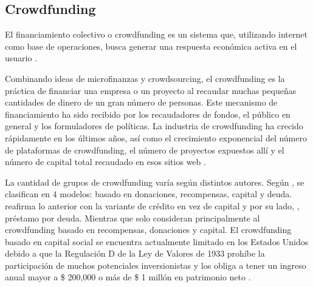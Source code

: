\subsection{Crowdfunding}
El financiamiento colectivo o crowdfunding es un sistema que, utilizando internet como base de operaciones, busca generar una respuesta económica activa en el usuario \parencite{cr_lopezgolan2017crowdfunding}.

Combinando ideas de microfinanzas y crowdsourcing, el crowdfunding es la práctica de financiar una empresa o un proyecto al recaudar muchas pequeñas cantidades de dinero de un gran número de personas. Este mecanismo de financiamiento ha sido recibido por los recaudadores de fondos, el público en general y los formuladores de políticas. La industria de crowdfunding ha crecido rápidamente en los últimos años, así como el crecimiento exponencial del número de plataformas de crowdfunding, el número de proyectos expuestos allí y el número de capital total recaudado en esos sitios web \parencite{cr_xuefeng2018chcrowdplatf}.

La cantidad de grupos de crowdfunding varía según distintos autores. Según \citeauthor{cr_hollas2013crwd}, se clasifican en 4 modelos: basado en donaciones, recompensas, capital y deuda. \citeauthor{cr_colgren2014risecrwd} reafirma lo anterior con la variante de crédito en vez de capital y por su lado, \citeauthor{cr_collins2014crwd}, préstamo por deuda. Mientras que \citeauthor{cr_lee2018fintech} solo consideran principalmente al crowdfunding basado en recompensas, donaciones y capital. El crowdfunding basado en capital social se encuentra actualmente limitado en los Estados Unidos debido a que la Regulación D de la Ley de Valores de 1933 prohíbe la participación de muchos potenciales inversionistas y los obliga a tener un ingreso anual mayor a \$ 200,000 o más de \$ 1 millón en patrimonio neto \parencite{cr_lichtig2015crowdfunding}.

